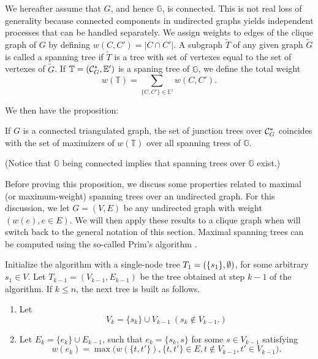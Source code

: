 We hereafter assume that $G$,
and hence $\mathbb G$, is connected. This is not real loss of
generality because connected components in undirected graphs yields
independent processes that can be handled separately.
We assign weights to edges of the clique graph of $G$ by defining
$w(C, C') = |C\cap C'|$. A
subgraph $\tilde T$ of any given graph $\tilde G$ is called a spanning
tree if $\tilde T$ is a tree with set of vertexes equal to the set of
vertexes of $\tilde G$. 
If 
$\mathbb T = ({\mathcal C}_G^*, \mathbb E')$  is a spaning tree of $\mathbb G$, we
define the total weight
\[
w(\mathbb T) = \sum_{\{C,C'\}\in\mathbb E'} w(C,C').
\]

We then have the
proposition:
\begin{proposition}\cite{finn1994optimal}
\label{prop:opt.jct}
If $G$ is a connected triangulated graph, the set of junction trees over ${\mathcal C}_G^*$ coincides with the set of
maximizers of $w(\mathbb T)$ over all spanning trees of $\mathbb G$.
\end{proposition} 
(Notice that $\mathbb G$ being connected implies that spanning trees
over $\mathbb G$ exist.)

Before proving this proposition, we discuss some properties related to
maximal (or maximum-weight) spanning trees over an undirected graph. 
For this discussion, we let $G = (V, E)$ be any undirected graph with
weight $(w(e), e\in E)$. We will then apply these results to a clique
graph when will switch back to the general notation of this section.
Maximal spanning trees can be computed using the so-called Prim's
algorithm \cite{jarnik1930jistem,prim1957shortest,dijkstra1959note}.

\begin{algorithm}
Initialize the algorithm with a single-node tree $T_1 =
(\{s_1\},  \emptyset)$, for some arbitrary $s_1\in V$.
Let $T_{k-1} = (V_{k-1}, E_{k-1})$ be the tree obtained at step $k-1$ of the algorithm. If $k\leq n$, the next tree is built as follows.
\begin{enumerate}
\item Let
\[
V_k = \{s_k\} \cup V_{k-1}\  (s_k\not \in V_{k-1}.)
\]
\item Let $E_k = \{e_k\}\cup E_{k-1}$, such that $e_k = \{s_k, s\}$ for some
$s\in V_{k-1}$ satisfying
\begin{equation}
\label{eq:prim}
w(e_k) = \max\Big(w(\{t, t'\}), \{t, t'\}\in E, t\not\in V_{k-1}, t'\in V_{k-1}\Big).
\end{equation}
\end{enumerate}
\end{algorithm}

